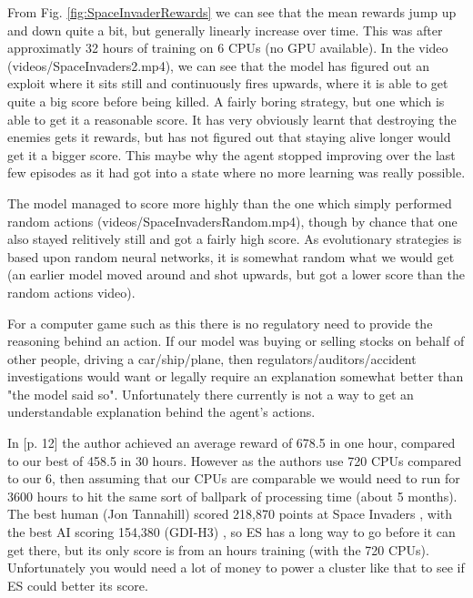\documentclass[a4pape, 11pt, english]{article}
\begin{document}
From Fig. \ref{fig:SpaceInvaderRewards} we can see that the mean rewards jump up and down quite a bit, but generally linearly increase over time. This was after approximatly 32 hours of training on 6 CPUs (no GPU available). In the video (videos/SpaceInvaders2.mp4), we can see that the model has figured out an exploit where it sits still and continuously fires upwards, where it is able to get quite a big score before being killed. A fairly boring strategy, but one which is able to get it a reasonable score. It has very obviously learnt that destroying the enemies gets it rewards, but has not figured out that staying alive longer would get it a bigger score. This maybe why the agent stopped improving over the last few episodes as it had got into a state where no more learning was really possible.

The model managed to score more highly than the one which simply performed random actions (videos/SpaceInvadersRandom.mp4), though by chance that one also stayed relitively still and got a fairly high score. As evolutionary strategies is based upon random neural networks, it is somewhat random what we would get (an earlier model moved around and shot upwards, but got a lower score than the random actions video).

For a computer game such as this there is no regulatory need to provide the reasoning behind an action. If our model was buying or selling stocks on behalf of other people, driving a car/ship/plane, then regulators/auditors/accident investigations would want or legally require an explanation somewhat better than "the model said so". Unfortunately there currently is not a way to get an understandable explanation behind the agent's actions.

In \citep{salimans_evolution_2017}[p. 12] the author achieved an average reward of 678.5 in one hour, compared to our best of 458.5 in 30 hours. However as the authors use 720 CPUs compared to our 6, then assuming that our CPUs are comparable we would need to run for 3600 hours to hit the same sort of ballpark of processing time (about 5 months). The best human (Jon Tannahill) scored 218,870 points at Space Invaders \citep{day_beating_2018}, with the best AI scoring 154,380 (GDI-H3) \citep{papers_with_code_papers_nodate}, so ES has a long way to go before it can get there, but its only score is from an hours training (with the 720 CPUs). Unfortunately you would need a lot of money to power a cluster like that to see if ES could better its score.
\end{document}

